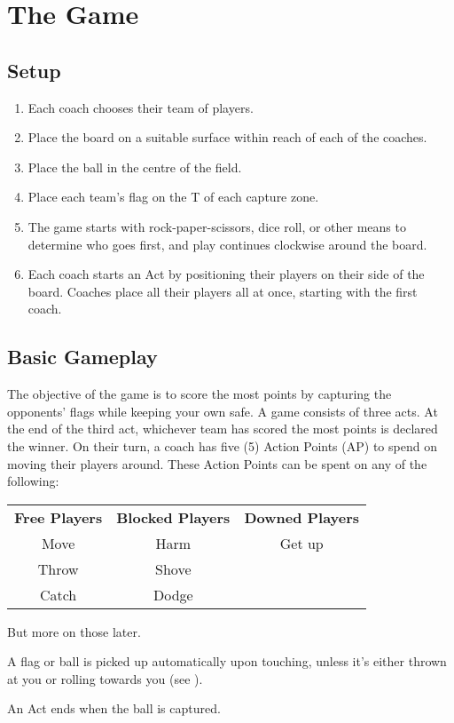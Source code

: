 \chapter{The Game}
\section{Setup}
\begin{enumerate}
    \item Each coach chooses their team of players.
    \item Place the board on a suitable surface within reach of each of the coaches.
    \item Place the ball in the centre of the field.
    \item Place each team's flag on the T of each capture zone.
    \item The game starts with rock-paper-scissors, dice roll, or other means to determine who goes first, and play continues clockwise around the board.
    \item Each coach starts an Act by positioning their players on their side of the board.
    Coaches place all their players all at once, starting with the first coach.
\end{enumerate}
\section{Basic Gameplay} \label{basic-gameplay}
The objective of the game is to score the most points by capturing the opponents' flags while keeping your own safe.
A game consists of three acts. 
At the end of the third act, whichever team has scored the most points is declared the winner.
On their turn, a coach has five (5) Action Points (AP) to spend on moving their players around.
These Action Points can be spent on any of the following:

\begin{center}
\begin{tabular}{ccc}
    \textbf{Free Players} & \textbf{Blocked Players} & \textbf{Downed Players}\\
    Move & Harm & Get up\\
    Throw & Shove & \\
    Catch & Dodge & 
\end{tabular}
\end{center}
But more on those later.

A flag or ball is picked up automatically upon touching, unless it's either thrown at you or rolling towards you (see ).

An Act ends when the ball is captured.




% 


